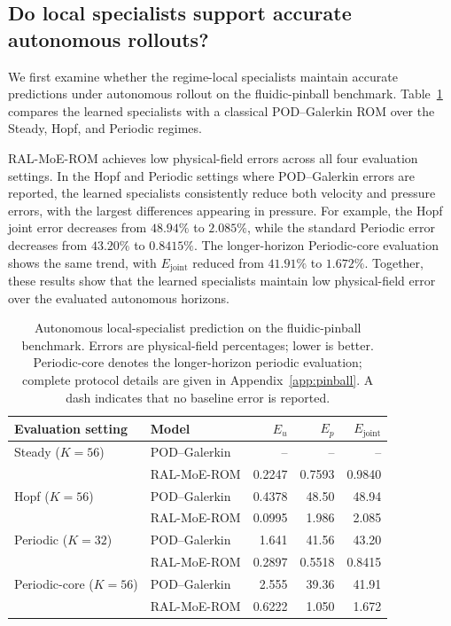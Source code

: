 \documentclass{article}
\begin{document}
\subsection{Do local specialists support accurate autonomous rollouts?}

We first examine whether the regime-local specialists maintain accurate predictions under autonomous rollout on the fluidic-pinball benchmark. Table~\ref{tab:pinball_autonomous} compares the learned specialists with a classical POD--Galerkin ROM over the Steady, Hopf, and Periodic regimes.

RAL-MoE-ROM achieves low physical-field errors across all four evaluation settings. In the Hopf and Periodic settings where POD--Galerkin errors are reported, the learned specialists consistently reduce both velocity and pressure
errors, with the largest differences appearing in pressure. For example, the Hopf joint error decreases from $48.94\%$ to $2.085\%$, while the standard Periodic error decreases from $43.20\%$ to $0.8415\%$. The longer-horizon Periodic-core evaluation shows the same trend, with $E_{\mathrm{joint}}$ reduced from $41.91\%$ to $1.672\%$. Together, these results show that the learned specialists maintain low physical-field error over the evaluated autonomous horizons.

\par
\begin{table}[H]
\centering
\caption{
Autonomous local-specialist prediction on the fluidic-pinball benchmark. Errors are physical-field percentages; lower is better. Periodic-core denotes the longer-horizon periodic evaluation; complete protocol details are given in Appendix~\ref{app:pinball}. A dash indicates that no baseline error is reported.
}
\label{tab:pinball_autonomous}
\small
\setlength{\tabcolsep}{5pt}
\begin{tabular}{@{}llrrr@{}}
\toprule
Evaluation setting & Model & $E_u$ & $E_p$ & $E_{\mathrm{joint}}$ \\
\midrule
Steady ($K=56$)
& POD--Galerkin
& -- & -- & -- \\
& RAL-MoE-ROM
& 0.2247 & 0.7593 & 0.9840 \\
\addlinespace

Hopf ($K=56$)
& POD--Galerkin
& 0.4378 & 48.50 & 48.94 \\
& RAL-MoE-ROM
& 0.0995 & 1.986 & 2.085 \\
\addlinespace

Periodic ($K=32$)
& POD--Galerkin
& 1.641 & 41.56 & 43.20 \\
& RAL-MoE-ROM
& 0.2897 & 0.5518 & 0.8415 \\
\addlinespace

Periodic-core ($K=56$)
& POD--Galerkin
& 2.555 & 39.36 & 41.91 \\
& RAL-MoE-ROM
& 0.6222 & 1.050 & 1.672 \\
\bottomrule
\end{tabular}
\end{table}
\par
\end{document}
